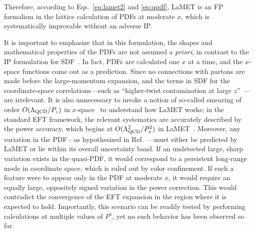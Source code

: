 \documentclass[prd,twocolumn,superscriptaddress,preprintnumbers,showpacs,nofootinbib,notitlepage,floatfix]{revtex4-2}
\DeclareRobustCommand{\eqs}[2]{Eqs.~\eqref{eq:#1} and \eqref{eq:#2}}
\DeclareRobustCommand{\eqs}[2]{Eqs.~(\ref{eq:#1}) and (\ref{eq:#2})}
\begin{document}
Therefore, according to \eqs{lamet2}{qpdf}, LaMET is an FP formalism in the lattice calculation of PDFs at moderate $x$, which is systematically improvable without an adverse IP.

It is important to emphasize that in this formulation, the shapes and mathematical properties of the PDFs are not assumed a \textit{priori}, in contrast to the IP formulation for SDF~\cite{Dutrieux:2025jed}.
In fact, PDFs are calculated one $x$ at a time, and the $x$-space functions come out as a prediction. Since no connections with partons are made before the large-momentum expansion, and the terms in SDF for the coordinate-space correlations---such as ``higher-twist contamination at large $z$''~\cite{Dutrieux:2025jed}---are irrelevant. 
It is also unnecessary to invoke a notion of so-called smearing of order $O(\Lambda_{\rm QCD}/P_z)$ in $x$-space~\cite{Dutrieux:2025jed} to understand how LaMET works; in the standard EFT framework, the relevant systematics are accurately described by the power accuracy, which begins at $O(\Lambda_{\rm QCD}^2/P_z^2)$ in LaMET~\cite{Zhang:2023bxs}.
Moreover, any variation in the PDF---as hypothesized in Ref.~\cite{Dutrieux:2025jed}---must either be predicted by LaMET or lie within its overall uncertainty band. If an undetected large, sharp variation exists in the quasi-PDF, it would correspond to a persistent long-range mode in coordinate space, which is ruled out by color confinement. If such a feature were to appear only in the PDF at moderate $x$, it would require an equally large, oppositely signed variation in the power correction. This would contradict the convergence of the EFT expansion in the region where it is expected to hold. Importantly, this scenario can be readily tested by performing calculations at multiple values of $P^z$, yet no such behavior has been observed so far.
\end{document}
